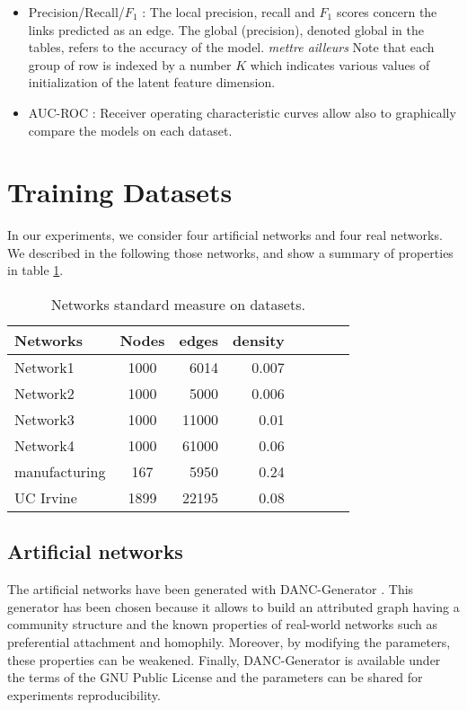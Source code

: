 \documentclass[a4paper, 12pt]{article}
\begin{document}
\begin{itemize}

\item Precision/Recall/$F_1$ :  The local precision, recall and $F_1$ scores concern the links predicted as an edge.  The global (precision), denoted global in the tables, refers to the accuracy of the model. 
\textit{mettre ailleurs} Note that each group of row is indexed by  a number $K$ which indicates various values of initialization of the latent feature dimension.
\item AUC-ROC : Receiver operating characteristic curves allow also to graphically compare the  models on each dataset.
\end{itemize}

\section{Training Datasets}

In our experiments, we consider four artificial networks and four real networks. We described in the following those networks, and show a summary of properties in table \ref{table:networks_measures}.


\begin{table}[h] 
	\centering
	\caption{Networks standard measure on datasets.}
		\begin{tabular}{lcrrrrcr}
			\hline
			Networks     & Nodes & edges & density    \\
			\hline
			Network1          & 1000  & 6014  & 0.007 \\
			Network2          & 1000  & 5000  & 0.006 \\
			Network3          & 1000  & 11000 & 0.01  \\
			Network4          & 1000  & 61000 & 0.06   \\
			manufacturing     & 167  & 5950   & 0.24  \\
			UC Irvine         & 1899 & 22195  & 0.08  \\
			\hline
		\end{tabular}
	\label{table:networks_measures}
\end{table}



\subsection{Artificial networks}

The artificial networks have been generated with DANC-Generator \cite{largeron2015}. This generator has been chosen because it allows to build an attributed graph having a community structure  and  the known properties of real-world networks such as preferential attachment and homophily.
Moreover, by modifying the parameters, these properties can be weakened. Finally, DANC-Generator is available under the terms of the GNU Public License and the parameters can be shared for experiments reproducibility.
\end{document}
